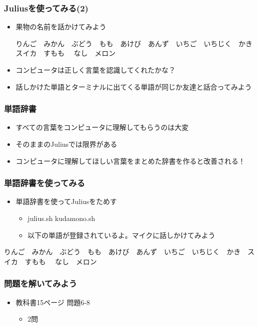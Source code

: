\documentclass[14pt]{beamer}
\begin{document}
\begin{frame}
  \frametitle{Juliusを使ってみる(2)}
  \begin{itemize}
    \item 果物の名前を話かけてみよう
    \begin{center}
      {\small りんご　みかん　ぶどう　もも　あけび　あんず　いちご　いちじく　かき　スイカ　すもも　	なし　メロン}
    \end{center}
    \item コンピュータは正しく言葉を認識してくれたかな？
    \item 話しかけた単語とターミナルに出てくる単語が同じか友達と話合ってみよう
  \end{itemize}
\end{frame}

\begin{frame}
  \frametitle{単語辞書}
  \begin{itemize}
    \item すべての言葉をコンピュータに理解してもらうのは大変
    \item そのままのJuliusでは限界がある
    \item コンピュータに理解してほしい言葉をまとめた辞書を作ると改善される！
  \end{itemize}
\end{frame}

\begin{frame}
  \frametitle{単語辞書を使ってみる}
  \begin{itemize}
    \item 単語辞書を使ってJuliusをためす
    \begin{itemize}
      \item julius.sh kudamono.sh
      \item 以下の単語が登録されているよ。マイクに話しかけてみよう
    \end{itemize}
  \end{itemize}
  \begin{center}
    {\small りんご　みかん　ぶどう　もも　あけび　あんず　いちご　いちじく　かき　スイカ　すもも　	なし　メロン}
  \end{center}
\end{frame}

\begin{frame}
  \frametitle{問題を解いてみよう}
  \begin{itemize}
    \item 教科書15ページ 問題6-8
    \begin{itemize}
      \item 2問
    \end{itemize}
  \end{itemize}
\end{frame}
\end{document}
